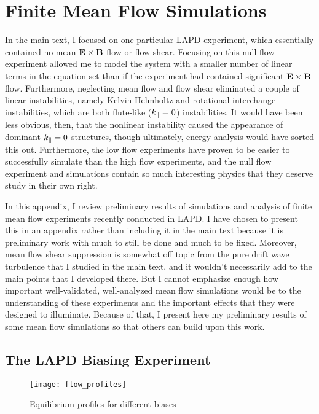 \chapter{Finite Mean Flow Simulations}
\label{app_mean_flow}

In the main text, I focused on one particular LAPD experiment, which essentially contained no mean ${\bf E \times B}$ flow or flow shear. Focusing on this null flow experiment
allowed me to model the system with a smaller number of linear terms in the equation set than if the experiment had contained significant ${\bf E \times B}$ flow. 
Furthermore, neglecting mean flow and flow shear eliminated a couple of linear instabilities, namely Kelvin-Helmholtz
and rotational interchange instabilities, which are both flute-like ($k_{\parallel} = 0$) instabilities. It would have been less obvious, then, that the nonlinear instability caused the appearance
of dominant $k_{\parallel} = 0$ structures, though ultimately, energy analysis would have sorted this out. Furthermore, the low flow experiments have proven to be easier to successfully simulate than
the high flow experiments, and the null flow experiment and simulations contain so much interesting physics that they deserve study in their own right.

In this appendix, I review preliminary results of simulations and analysis of finite mean flow experiments recently conducted in LAPD. 
I have chosen to present this in an appendix rather than including it in the main text because it is preliminary work with much to still be done and much to be fixed. 
Moreover, mean flow shear suppression is somewhat off topic from the pure drift wave turbulence that I studied in the main
text, and it wouldn't necessarily add to the main points that I developed there. But I cannot emphasize enough how important well-validated, well-analyzed mean flow simulations would be
to the understanding of these experiments and the important effects that they were designed to illuminate. Because of that, I present here my preliminary results of some mean flow simulations
so that others can build upon this work.


\section{The LAPD Biasing Experiment}
\label{s_biasing_exp}

\begin{figure}
\centerline{\texttt{[image: flow\_profiles]}}
\caption{Equilibrium profiles for different biases}
\label{flow_profiles}
\end{figure}

